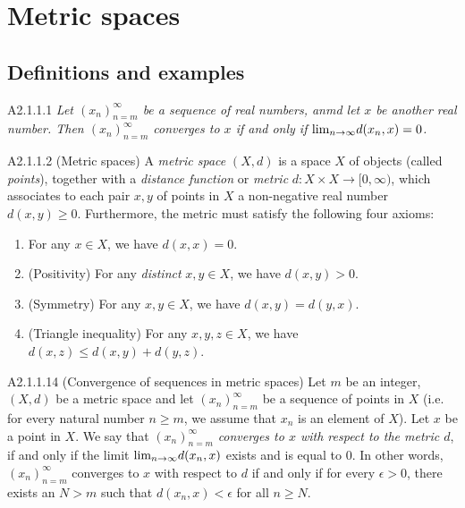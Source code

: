 \section{Metric spaces}
\subsection{Definitions and examples}
\begin{lemma}{A2.1.1.1}
    \emph{Let $(x_n)_{n=m}^{\infty}$ be a sequence of real numbers, anmd let $x$
    be another real number. Then $(x_n)_{n=m}^{\infty}$ converges to $x$ if and
    only if $\text{lim}_{n \rightarrow \infty}{d(x_n, x)} = 0$.}
\end{lemma}

\begin{definition}{A2.1.1.2}
    (Metric spaces) A \emph{metric space} $(X, d)$ is a space $X$ of objects
    (called \emph{points}), together with a \emph{distance function} or \emph{metric}
    $d: X \times X \rightarrow [0, \infty)$, which associates to each pair $x, y$
    of points in $X$ a non-negative real number $d(x, y) \geq 0$. Furthermore, the
    metric must satisfy the following four axioms:
    \begin{enumerate}
        \item For any $x \in X$, we have $d(x, x) = 0$.
        \item (Positivity) For any \emph{distinct} $x, y \in X$, we have $d(x, y) > 0$.
        \item (Symmetry) For any $x, y \in X$, we have $d(x, y) = d(y, x)$.
        \item (Triangle inequality) For any $x, y, z \in X$, we have $d(x, z) \leq d(x, y) + d(y, z)$.
    \end{enumerate}
\end{definition}

\begin{definition}{A2.1.1.14}
    (Convergence of sequences in metric spaces) Let $m$ be an integer, $(X, d)$
    be a metric space and let $(x_n)_{n=m}^{\infty}$ be a sequence of points in $X$
    (i.e. for every natural number $n \geq m$, we assume that $x_n$ is an element
    of $X$). Let $x$ be a point in $X$. We say that $(x_n)_{n=m}^{\infty}$ \emph{converges
    to $x$ with respect to the metric $d$}, if and only if the limit $\text{lim}_{n \rightarrow \infty}{d(x_n, x)}$
    exists and is equal to 0. In other words, $(x_n)_{n=m}^{\infty}$ converges to $x$
    with respect to $d$ if and only if for every $\epsilon > 0$, there exists an
    $N > m$ such that $d(x_n, x) < \epsilon$ for all $n \geq N$.
\end{definition}


